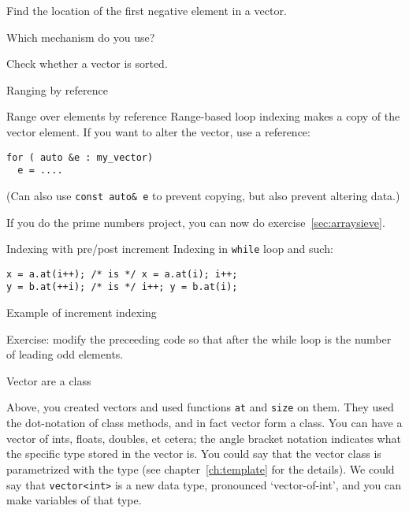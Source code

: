 \begin{exercise}
  \label{ex:array-maxidx}
  Find the location of the first negative element in a vector.

  Which mechanism do you use?
\end{exercise}

\begin{exercise}
  \label{ex:array-sorted}
  Check whether a vector is sorted.
\end{exercise}

 {Ranging by reference}

\begin{block}{Range over elements by reference}
  \label{sl:array-range-ref}
  Range-based loop indexing makes a copy of the vector element. If you
  want to alter the vector, use a reference:
\begin{lstlisting}
for ( auto &e : my_vector)
  e = ....
\end{lstlisting}
%

(Can also use \lstinline{const auto& e} to prevent copying, but also
prevent altering data.)
\end{block}

\begin{exercise}
  If you do the prime numbers project, you can now do exercise~\ref{sec:arraysieve}.
\end{exercise}

\begin{block}{Indexing with pre/post increment}
  \label{sl:prepostindex}
Indexing in \lstinline{while} loop and such:
\begin{lstlisting}
x = a.at(i++); /* is */ x = a.at(i); i++;
y = b.at(++i); /* is */ i++; y = b.at(i);
\end{lstlisting}
\end{block}

\begin{block}{Example of increment indexing}
  \label{sl:plusplusexample}
\end{block}

\begin{exercise}
  Exercise: modify the preceeding code so that after the while loop
   is the number of leading odd elements.
\end{exercise}

 {Vector are a class}
\label{sec:stdvector}

Above, you created vectors and used functions \lstinline{at} and \lstinline{size}
on them. They used the dot-notation of class methods, and in fact
vector form a  class. You can have a vector of ints,
floats, doubles, et cetera; 
the angle bracket notation indicates what the specific type stored in
the vector is.
You could say that the vector class is parametrized with the type (see
chapter~\ref{ch:template} for the details). We could say that
\lstinline{vector<int>} is a new data type, pronounced `vector-of-int', and you can
make variables of that type.

